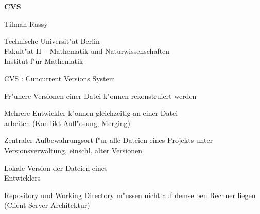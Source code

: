 \documentclass{article}
\begin{document}
\sffamily

\pagebreak


\begin{center}

\textbf{\color{headlinecolor}\titlesize 
CVS}

\vspace{1.0cm}

\normalsize
Tilman Rassy

\vspace{1.0cm}

Technische Universit"at Berlin \\
Fakult"at II -- Mathematik und Naturwissenschaften \\
Institut f"ur Mathematik

\end{center}

\pagebreak


\begin{mylist}

  \pitem CVS : Cuncurrent Versions System

  \pitem Fr"uhere Versionen einer Datei k"onnen rekonstruiert werden

  \pitem Mehrere Entwickler k"onnen gleichzeitig an einer Datei\\ arbeiten
     (Konflikt-Aufl"osung, Merging)

  \pitem {} Zentraler Aufbewahrungsort f"ur alle Dateien eines Projekts
     unter Versionsverwaltung, einschl. alter Versionen

  \pitem {} Lokale Version der Dateien eines\\ Entwicklers

  \pitem Repository und Working Directory m"ussen nicht auf demselben Rechner liegen
     (Client-Server-Architektur)

\end{mylist}

\pagebreak

\end{document}
